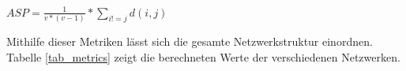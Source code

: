 $ASP = \frac{1}{v * (v - 1)} * \sum\limits_{i!=j} d(i,j)$

Mithilfe dieser Metriken lässt sich die gesamte Netzwerkstruktur einordnen.
Tabelle \ref{tab_metrics} zeigt die berechneten Werte der verschiedenen Netzwerken.

\begin{table}[h]
    \centering
    \caption{Metrikwerte der Netzwerke}
    \label{tab_metrics}
\end{table}
